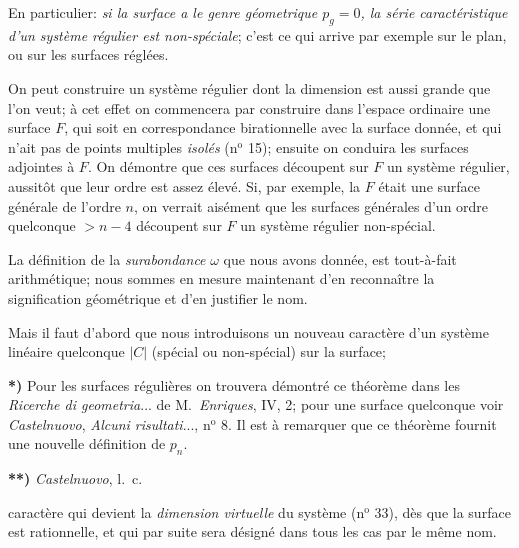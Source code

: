 \documentclass{article}
\begin{document}
En particulier: \emph{si la surface a le genre géometrique $p_{g} = 0$, la série caractéristique d'un système régulier est non-spéciale}; c'est ce qui arrive par exemple sur le plan, ou sur les surfaces réglées.

On peut construire un système régulier dont la dimension est aussi grande que l'on veut; à cet effet on commencera par construire dans l'espace ordinaire une surface $F$, qui soit en correspondance birationnelle avec la surface donnée, et qui n'ait pas de points multiples \emph{isolés} (n${}^{\text{o}}$ 15); ensuite on conduira les surfaces adjointes à $F$. On démontre que ces surfaces découpent sur $F$ un système régulier, aussitôt que leur ordre est assez élevé. Si, par exemple, la $F$ était une surface générale de l'ordre $n$, on verrait aisément que les surfaces générales d'un ordre quelconque $> n - 4$ découpent sur $F$ un système régulier non-spécial.

La définition de la \emph{surabondance} $\omega$ que nous avons donnée, est tout-à-fait arithmétique; nous sommes en mesure maintenant d'en reconnaître la signification géométrique et d'en justifier le nom.

Mais il faut d'abord que nous introduisons un nouveau caractère d'un système linéaire quelconque $|C|$ (spécial ou non-spécial) sur la surface;

\textbf{*)} Pour les surfaces régulières on trouvera démontré ce théorème dans les \emph{Ricerche di geometria}... de M.\ \emph{Enriques}, IV, 2; pour une surface quelconque voir \emph{Castelnuovo}, \emph{Alcuni risultati}..., n${}^{\text{o}}$ 8. Il est à remarquer que ce théorème fournit une nouvelle définition de $p_{n}$.

\textbf{**)} \emph{Castelnuovo}, l.\ c.

caractère qui devient la \emph{dimension virtuelle} du système (n${}^{\text{o}}$ 33), dès que la surface est rationnelle, et qui par suite sera désigné dans tous les cas par le même nom.
\end{document}
